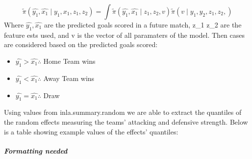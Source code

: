 \documentclass[
]{article}
\providecommand{\tightlist}{%
  \setlength{\itemsep}{0pt}\setlength{\parskip}{0pt}}
\begin{document}
\[\tilde{\pi}(\hat{y_1} ,\hat{x_1} \mid y_1 , x_1, z_1, z_2) = \int \tilde{\pi}(\hat{y_1} ,\hat{x_1} \mid z_1 ,z_2,v)  \tilde{\pi}(v \mid y_1 , y_2,  z_1 ,z_2,)\]
Where \(\hat{y_1} ,\hat{x_1}\) are the predicted goals scored in a
future match, z\_1 z\_2 are the feature ests used, and v is the vector
of all paramaters of the model. Then cases are considered based on the
predicted goals scored:

\begin{itemize}
\tightlist
\item
  \(\hat{y_1} > \hat{x_1} \therefore\) Home Team wins
\item
  \(\hat{y_1} < \hat{x_1} \therefore\) Away Team wins
\item
  \(\hat{y_1} = \hat{x_1} \therefore\) Draw
\end{itemize}

\pagebreak

Using values from inla.summary.random we are able to extract the
quantiles of the random effects measuring the teams' attacking and
defensive strength. Below is a table showing example values of the
effects' quantiles:

\hypertarget{formatting-needed}{%
\subparagraph{Formatting needed}\label{formatting-needed}}
\end{document}

